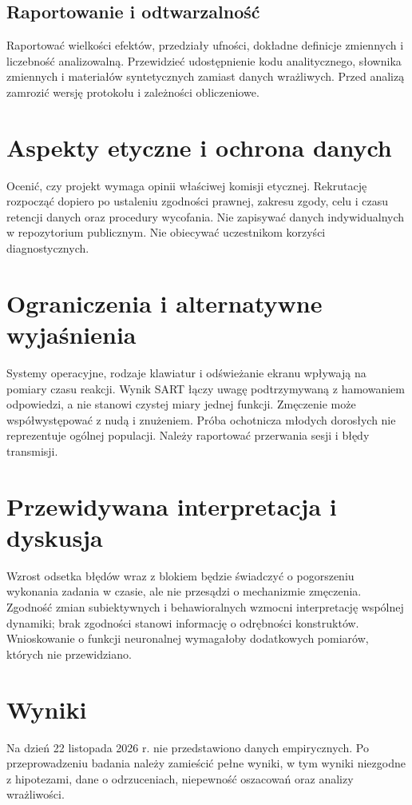 \documentclass[11pt,a4paper]{article}
\begin{document}
\subsection{Raportowanie i odtwarzalność}
Raportować wielkości efektów, przedziały ufności, dokładne definicje zmiennych i liczebność analizowalną. Przewidzieć udostępnienie kodu analitycznego, słownika zmiennych i materiałów syntetycznych zamiast danych wrażliwych. Przed analizą zamrozić wersję protokołu i zależności obliczeniowe.
\section{Aspekty etyczne i ochrona danych}
Ocenić, czy projekt wymaga opinii właściwej komisji etycznej. Rekrutację rozpocząć dopiero po ustaleniu zgodności prawnej, zakresu zgody, celu i czasu retencji danych oraz procedury wycofania. Nie zapisywać danych indywidualnych w repozytorium publicznym. Nie obiecywać uczestnikom korzyści diagnostycznych.
\section{Ograniczenia i alternatywne wyjaśnienia}
Systemy operacyjne, rodzaje klawiatur i odświeżanie ekranu wpływają na pomiary czasu reakcji. Wynik SART łączy uwagę podtrzymywaną z hamowaniem odpowiedzi, a nie stanowi czystej miary jednej funkcji. Zmęczenie może współwystępować z nudą i znużeniem. Próba ochotnicza młodych dorosłych nie reprezentuje ogólnej populacji. Należy raportować przerwania sesji i błędy transmisji.
\section{Przewidywana interpretacja i dyskusja}
Wzrost odsetka błędów wraz z blokiem będzie świadczyć o pogorszeniu wykonania zadania w czasie, ale nie przesądzi o mechanizmie zmęczenia. Zgodność zmian subiektywnych i behawioralnych wzmocni interpretację wspólnej dynamiki; brak zgodności stanowi informację o odrębności konstruktów. Wnioskowanie o funkcji neuronalnej wymagałoby dodatkowych pomiarów, których nie przewidziano.
\section{Wyniki}
Na dzień 22 listopada 2026 r. nie przedstawiono danych empirycznych. Po przeprowadzeniu badania należy zamieścić pełne wyniki, w tym wyniki niezgodne z hipotezami, dane o odrzuceniach, niepewność oszacowań oraz analizy wrażliwości.
\end{document}
